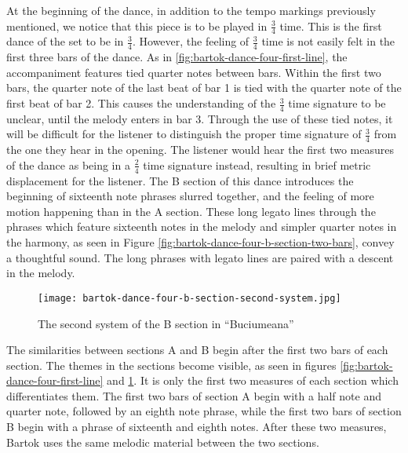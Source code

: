 At the beginning of the dance, in addition to the tempo markings previously mentioned, we notice that this piece is to be played in $\frac{3}{4}$ time. This is the first dance of the set to be in $\frac{3}{4}$. However, the feeling of $\frac{3}{4}$ time is not easily felt in the first three bars of the dance. As in \ref{fig:bartok-dance-four-first-line}\autocite{Lung_2016}, the accompaniment features tied quarter notes between bars. Within the first two bars, the quarter note of the last beat of bar 1 is tied with the quarter note of the first beat of bar 2. This causes the understanding of the $\frac{3}{4}$ time signature to be unclear, until the melody enters in bar 3. Through the use of these tied notes, it will be difficult for the listener to distinguish the proper time signature of $\frac{3}{4}$ from the one they hear in the opening. The listener would hear the first two measures of the dance as being in a $\frac{2}{4}$ time signature instead, resulting in brief metric displacement for the listener. The B section of this dance introduces the beginning of sixteenth note phrases slurred together, and the feeling of more motion happening than in the A section. These long legato lines through the phrases which feature sixteenth notes in the melody and simpler quarter notes in the harmony, as seen in Figure \ref{fig:bartok-dance-four-b-section-two-bars}\autocite{Lung_2016}, convey a thoughtful sound. The long phrases with legato lines are paired with a descent in the melody. 

\begin{figure}
  \centering
  \texttt{[image: bartok-dance-four-b-section-second-system.jpg]}
  \caption[The second system of ``Buciumeana'' in Bartok's \textit{Romanian Folk Dances, Sz. 56, BB 88}]{The second system of the B section in ``Buciumeana''}
  \label{fig:bartok-dance-four-b-section-second-system}
\end{figure}

The similarities between sections A and B begin after the first two bars of each section. The themes in the sections become visible, as seen in figures \ref{fig:bartok-dance-four-first-line}\autocite{Lung_2016} and \ref{fig:bartok-dance-four-b-section-second-system}\autocite{Lung_2016}. It is only the first two measures of each section which differentiates them. The first two bars of section A begin with a half note and quarter note, followed by an eighth note phrase, while the first two bars of section B begin with a phrase of sixteenth and eighth notes. After these two measures, Bartok uses the same melodic material between the two sections. 

